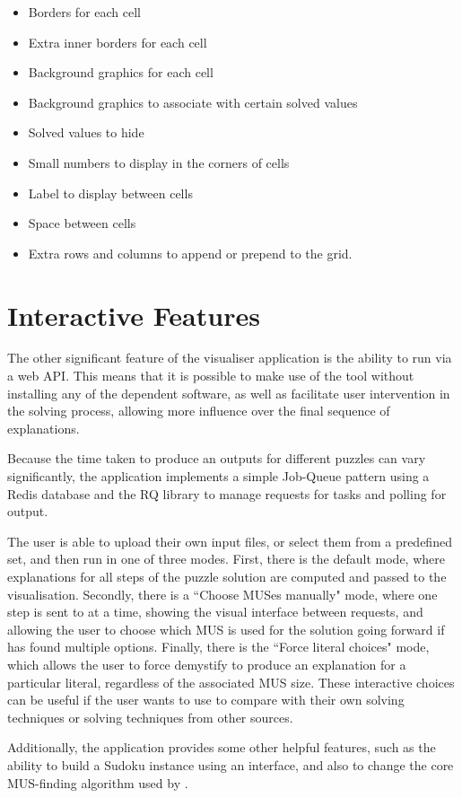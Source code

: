 \documentclass[10pt]{article}
\begin{document}
\begin{itemize}
\item Borders for each cell
\item Extra inner borders for each cell
\item Background graphics for each cell
\item Background graphics to associate with certain solved values
\item Solved values to hide
\item Small numbers to display in the corners of cells
\item Label to display between cells
\item Space between cells
\item Extra rows and columns to append or prepend to the grid.
\end{itemize}

\section{Interactive Features}
The other significant feature of the visualiser application is the ability to run \demystify via a web API. This means that it is possible to make use of the tool without installing any of the dependent software, as well as facilitate user intervention in the solving process, allowing more influence over the final sequence of explanations.

Because the time taken to produce an outputs for different puzzles can vary significantly, the application implements a simple Job-Queue pattern using a Redis database and the RQ library to manage requests for \demystify tasks and polling for output. 

The user is able to upload their own \eprime input files, or select them from a predefined set, and then run \demystify in one of three modes. First, there is the default mode, where explanations for all steps of the puzzle solution are computed and passed to the visualisation. Secondly, there is a ``Choose MUSes manually" mode, where one step is sent to \demystify at a time, showing the visual interface between requests, and allowing the user to choose which MUS is used for the solution going forward if \demystify has found multiple options. Finally, there is the ``Force literal choices" mode, which allows the user to force demystify to produce an explanation for a particular literal, regardless of the associated MUS size. These interactive choices can be useful if the user wants to use \demystify to compare with their own solving techniques or solving techniques from other sources. 

Additionally, the application provides some other helpful features, such as the ability to build a Sudoku instance using an interface, and also to change the core MUS-finding algorithm used by \demystify.
\end{document}
